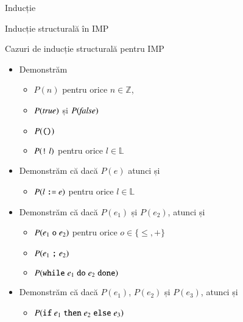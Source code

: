\documentclass[xcolor=pdftex,romanian,colorlinks]{beamer}
\begin{document}
\begin{section}{Inducție}
\begin{subsection}{Inducție structurală în IMP}
\begin{frame}{Cazuri de inducție structurală pentru IMP}
\begin{itemize}
\item[]  
Demonstrăm
\begin{itemize}
\item $P(n)$ pentru orice $n \in \mathbb{Z}$,
\item $P({\it true})$ și $P({\it false})$
\item $P(\mathrel{\text{\ttfamily ()}})$
\item$P(\mathrel{\text{\ttfamily !}} l)$ pentru orice $l\in \mathbb{L}$
\end{itemize}

\item[]   
Demonstrăm că dacă $P(e)$ atunci și
\begin{itemize}
\item $P(l \mathrel{\text{\ttfamily :=}} e)$ pentru orice $l \in \mathbb{L}$
\end{itemize}
\item[] 
Demonstrăm că dacă $P(e_1)$ și $P(e_2)$, atunci și
\begin{itemize}
\item $P(e_1 \mathrel{\text{\ttfamily o}} e_2)$ pentru orice $o \in \{\leq, +\}$
\item $P(e_1 \mathrel{\text{\ttfamily ;}} e_2)$
\item $P(\mathrel{\text{\ttfamily while}} e_1 \mathrel{\text{\ttfamily do}} e_2 \mathrel{\text{\ttfamily done}})$ 
\end{itemize}
\item[]
Demonstrăm că dacă $P(e_1)$, $P(e_2)$ și $P(e_3)$, atunci și 
\begin{itemize}
\item $P(\mathrel{\text{\ttfamily if}} e_1 \mathrel{\text{\ttfamily then}} e_2 \mathrel{\text{\ttfamily else}} e_3)$ 
\end{itemize}
\end{itemize}
\end{frame}


\end{subsection}
\end{section}
\end{document}
